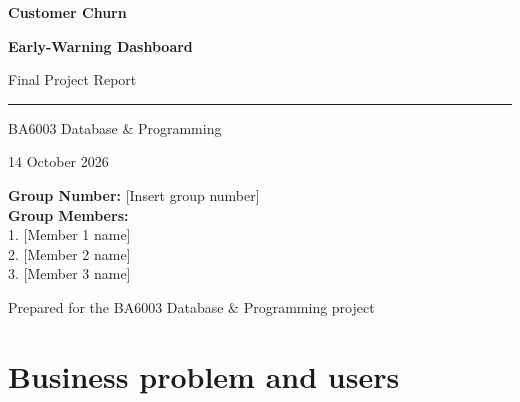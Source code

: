 \documentclass[11pt,a4paper]{article}
\author{}
\date{}
\begin{document}
\begin{titlepage}
\centering
\vspace*{1.6cm}
{\Huge\bfseries\color{blue!55!black} Customer Churn\par}
\vspace{0.25cm}
{\Huge\bfseries\color{blue!55!black} Early-Warning Dashboard\par}
\vspace{0.8cm}
{\Large Final Project Report\par}
\vspace{1.0cm}
\rule{0.82\textwidth}{1pt}\par
\vspace{0.7cm}
{\large BA6003 Database \& Programming\par}
\vspace{0.25cm}
{\large 14 October 2026\par}
\vspace{1.0cm}
\begin{minipage}{0.82\textwidth}
\large
\textbf{Group Number:} [Insert group number]\\[0.45cm]
\textbf{Group Members:}\\[0.15cm]
1. [Member 1 name]\\
2. [Member 2 name]\\
3. [Member 3 name]\\
\end{minipage}
\vfill
{\small Prepared for the BA6003 Database \& Programming project\par}
\end{titlepage}

\begin{abstract}
We built an end-to-end early-warning workflow on 7,043 telecom customers. The model flags the 22\% of customers who carry 54\% of all churn (65\% precision), explains why each one is at risk, and drafts a verified retention script. Contacting the 537 still-active High and Critical customers returns an estimated USD 84k net benefit (ROI about 596\%) under stated assumptions. These results are based on the reported dataset and simulation assumptions; the estimated business impact should not be interpreted as a measured outcome from a live retention campaign.
\end{abstract}
\clearpage
\renewcommand{\contentsname}{0. Contents}
\tableofcontents
\clearpage
{}

\section{Business problem and users}
\end{document}
